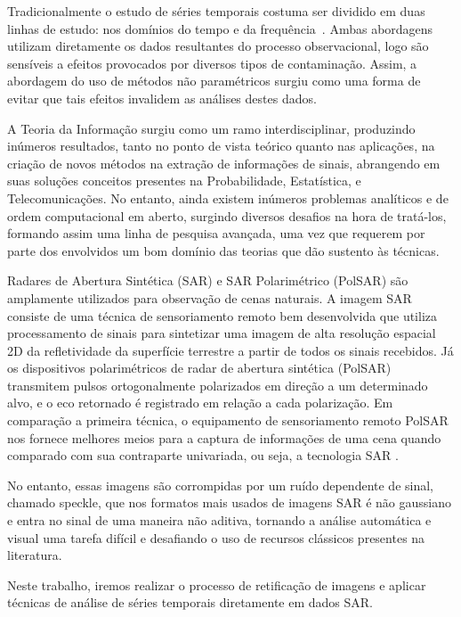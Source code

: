 \documentclass[12pt]{ctexart}
\begin{document}
Tradicionalmente o estudo de séries temporais costuma ser dividido em duas linhas de estudo: nos domínios do tempo e da frequência~\cite{BrockwellDavis91}. Ambas abordagens utilizam diretamente os dados resultantes do processo observacional, logo são sensíveis a efeitos provocados por diversos tipos de contaminação. Assim, a abordagem do uso de métodos não paramétricos surgiu como uma forma de evitar que tais efeitos invalidem as análises destes dados.

A Teoria da Informação surgiu como um ramo interdisciplinar, produzindo inúmeros resultados, tanto no ponto de vista teórico quanto nas aplicações, na criação de novos métodos na extração de informações de sinais, abrangendo em suas soluções conceitos presentes na Probabilidade, Estatística, e Telecomunicações. No entanto, ainda existem inúmeros problemas analíticos e de ordem computacional em aberto, surgindo diversos desafios na hora de tratá-los, formando assim uma linha de pesquisa avançada, uma vez que requerem por parte dos envolvidos um bom domínio das teorias que dão sustento às técnicas.

Radares de Abertura Sintética (SAR) e SAR Polarimétrico (PolSAR) são amplamente utilizados para observação de cenas naturais. A imagem SAR consiste de uma técnica de sensoriamento remoto bem desenvolvida que utiliza processamento de sinais para sintetizar uma imagem de alta resolução espacial 2D da refletividade da superfície terrestre a partir de todos os sinais recebidos.
Já os dispositivos polarimétricos de radar de abertura sintética (PolSAR) transmitem pulsos ortogonalmente polarizados em direção a um determinado alvo, e o eco retornado é registrado em relação a cada polarização. Em comparação a primeira técnica, o equipamento de sensoriamento remoto PolSAR nos fornece melhores meios para a captura de informações de uma cena quando comparado com sua contraparte univariada, ou seja, a tecnologia SAR \cite{polsar.book} \cite{Multidimensional.Speckle.Noise.Model}.

No entanto, essas imagens são corrompidas por um ruído dependente de sinal, chamado speckle, que nos formatos mais usados de imagens SAR é não gaussiano e entra no sinal de uma maneira não aditiva, tornando a análise automática e visual uma tarefa difícil e desafiando o uso de recursos clássicos presentes na literatura. 

Neste trabalho, iremos realizar o processo de retificação de imagens e aplicar técnicas de análise de séries temporais diretamente em dados SAR.
\end{document}
